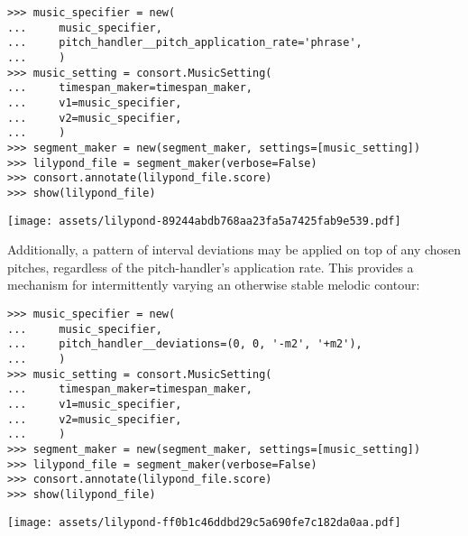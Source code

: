 \begin{abjadbookoutput}
\begin{singlespacing}
\vspace{-0.5\baselineskip}
\begin{lstlisting}
>>> music_specifier = new(
...     music_specifier,
...     pitch_handler__pitch_application_rate='phrase',
...     )
>>> music_setting = consort.MusicSetting(
...     timespan_maker=timespan_maker,
...     v1=music_specifier,
...     v2=music_specifier,
...     )
>>> segment_maker = new(segment_maker, settings=[music_setting])
>>> lilypond_file = segment_maker(verbose=False)
>>> consort.annotate(lilypond_file.score)
>>> show(lilypond_file)
\end{lstlisting}
\noindent\texttt{[image: assets/lilypond-89244abdb768aa23fa5a7425fab9e539.pdf]}
\end{singlespacing}
\end{abjadbookoutput}

\noindent Additionally, a pattern of interval deviations may be applied on top
of any chosen pitches, regardless of the pitch-handler's application rate. This
provides a mechanism for intermittently varying an otherwise stable melodic
contour:

\begin{comment}
<abjad>[stylesheet=../consort.ily]
music_specifier = new(
    music_specifier,
    pitch_handler__deviations=(0, 0, '-m2', '+m2'),
    )
music_setting = consort.MusicSetting(
    timespan_maker=timespan_maker,
    v1=music_specifier,
    v2=music_specifier,
    )
segment_maker = new(segment_maker, settings=[music_setting])
lilypond_file = segment_maker(verbose=False)
consort.annotate(lilypond_file.score)
show(lilypond_file)
</abjad>
\end{comment}

\begin{abjadbookoutput}
\begin{singlespacing}
\vspace{-0.5\baselineskip}
\begin{lstlisting}
>>> music_specifier = new(
...     music_specifier,
...     pitch_handler__deviations=(0, 0, '-m2', '+m2'),
...     )
>>> music_setting = consort.MusicSetting(
...     timespan_maker=timespan_maker,
...     v1=music_specifier,
...     v2=music_specifier,
...     )
>>> segment_maker = new(segment_maker, settings=[music_setting])
>>> lilypond_file = segment_maker(verbose=False)
>>> consort.annotate(lilypond_file.score)
>>> show(lilypond_file)
\end{lstlisting}
\noindent\texttt{[image: assets/lilypond-ff0b1c46ddbd29c5a690fe7c182da0aa.pdf]}
\end{singlespacing}
\end{abjadbookoutput}

